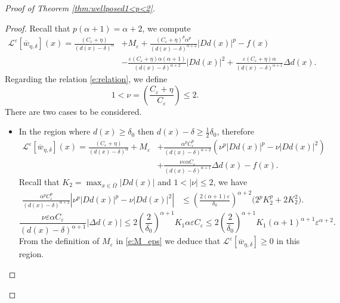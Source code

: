 \documentclass[11pt,reqno]{amsart}
\numberwithin{figure}{section}
\theoremstyle{plain}
\theoremstyle{remark}
\numberwithin{equation}{section}
\begin{document}
\begin{appendices}
\begin{proof} [Proof of Theorem \ref{thm:wellposed1<p<2}]
\begin{proof} Recall that $p(\alpha+1) = \alpha+2$, we compute
\begin{align*}
    \mathcal{L}^\varepsilon\left[\overline{w}_{\eta,\delta}\right](x) = \frac{ (C_\varepsilon + \eta)}{(d(x)-\delta)^\alpha} &+ M_\varepsilon + \frac{(C_\varepsilon+\eta)^p \alpha^p}{(d(x)-\delta)^{\alpha+2}}|D d(x)|^p - f(x) \\
    &- \frac{\varepsilon(C_\varepsilon+\eta)\alpha(\alpha+1)}{(d(x)-\delta)^{\alpha+2}}|D d(x)|^2 + \frac{\varepsilon(C_\varepsilon+\eta)\alpha}{(d(x)-\delta)^{\alpha+1}}\Delta d(x).
\end{align*}
Regarding the relation \eqref{e:relation}, we define
\begin{equation*}
    1<\nu = \left(\frac{C_\varepsilon+\eta}{C_\varepsilon}\right) \leq 2.
\end{equation*}
There are two cases to be considered.
\begin{itemize}
    \item In the region where $d(x)\geq \delta_0$ then $d(x)-\delta \geq \frac{1}{2}\delta_0$, therefore 
    \begin{align*}
        \mathcal{L}^\varepsilon\left[\overline{w}_{\eta,\delta}\right](x) = \frac{ (C_\varepsilon + \eta)}{(d(x)-\delta)^\alpha} + M_\varepsilon &+ \frac{\alpha^pC_\varepsilon^p}{(d(x)-\delta)^{\alpha+2}}\left(\nu^{p}|Dd(x)|^p - \nu|Dd(x)|^2\right)\\
        &+\frac{\nu\varepsilon \alpha C_\varepsilon}{(d(x)-\delta)^{\alpha+1}}\Delta d(x) - f(x).
    \end{align*}
Recall that $K_2 = \max_{x\in\overline{\Omega}}|Dd(x)|$ and $1<|\nu|\leq 2$, we have
\begin{align*}
    \frac{\alpha^pC_\varepsilon^p}{(d(x)-\delta)^{\alpha+2}}\left|\nu^{p}|Dd(x)|^p - \nu|Dd(x)|^2\right| &\leq \left(\frac{2(\alpha+1)\varepsilon}{\delta_0}\right)^{\alpha+2}\big(2^pK_2^p+2K_2^2\big).
\end{align*}
\begin{equation*}
    \frac{\nu\varepsilon \alpha C_\varepsilon}{(d(x)-\delta)^{\alpha+1}}|\Delta d(x)| \leq 2\left(\frac{2}{\delta_0}\right)^{\alpha+1}K_1 \alpha\varepsilon C_\varepsilon \leq 2\left(\frac{2}{\delta_0}\right)^{\alpha+1}K_1 (\alpha+1)^{\alpha+1}\varepsilon^{\alpha+2}.
\end{equation*}
 From the definition of $M_\varepsilon$ in \eqref{e:M_eps} we deduce that $\mathcal{L}^\varepsilon\left[\overline{w}_{\eta,\delta}\right]\geq 0$ in this region.

\end{itemize}
\end{proof}
\end{proof}
\end{appendices}
\end{document}
